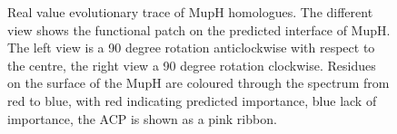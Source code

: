 			\setlength\fboxsep{5pt}
			\setlength\fboxrule{1.5pt}
			\begin{figure} [h!]
			\centering
			\caption[Real value evolutionary trace of MupH homologues.]{Real value evolutionary trace of MupH homologues. The different view shows the functional patch on the predicted interface of MupH. The left view is a 90 degree rotation anticlockwise with respect to the centre, the right view a 90 degree rotation clockwise. Residues on the surface of the MupH are coloured through the spectrum from red to blue, with red indicating predicted importance, blue lack of importance, the ACP is shown as a pink ribbon.}
			\label{fig:ET}
			\end{figure}		

